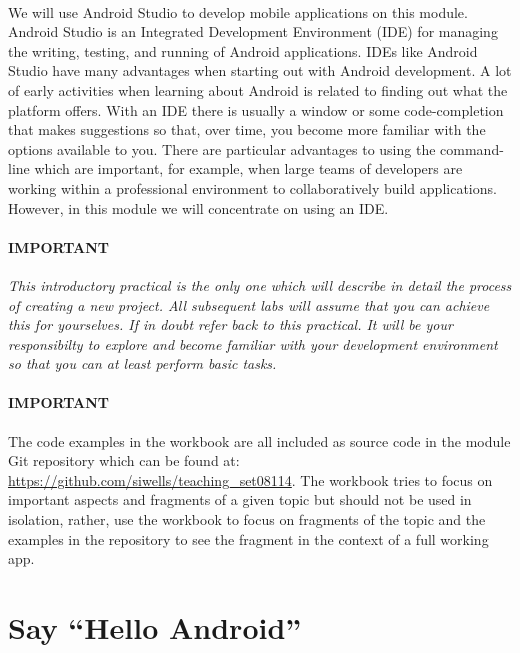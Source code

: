 \paragraph{} We will use Android Studio to develop mobile applications on this module. Android Studio is an Integrated Development Environment (IDE) for managing the writing, testing, and running of Android applications. IDEs like Android Studio have many advantages when starting out with Android development. A lot of early activities when learning about Android is related to finding out what the platform offers. With an IDE there is usually a window or some code-completion that makes suggestions so that, over time, you become more familiar with the options available to you. There are particular advantages to using the command-line which are important, for example, when large teams of developers are working within a professional environment to collaboratively build applications. However, in this module we will concentrate on using an IDE.

\begin{framed}
\paragraph{IMPORTANT} \emph{This introductory practical is the only one which will describe in detail the process of creating a new project. All subsequent labs will assume that you can achieve this for yourselves. If in doubt refer back to this practical. It will be your responsibilty to explore and become familiar with your development environment so that you can at least perform basic tasks.}
\end{framed}

\begin{framed}
\paragraph{IMPORTANT} The code examples in the workbook are all included as source code in the module Git repository which can be found at: \url{https://github.com/siwells/teaching_set08114}. The workbook tries to focus on important aspects and fragments of a given topic but should not be used in isolation, rather, use the workbook to focus on fragments of the topic and the examples in the repository to see the fragment in the context of a full working app.
\end{framed}

\section{Say ``Hello Android''}
\label{hello}
